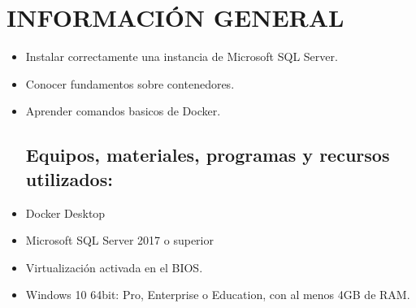 \section{INFORMACIÓN GENERAL} 

\begin{itemize}
\subsection{Objetivos:}
	\item Instalar correctamente una instancia de Microsoft SQL Server.
	\item Conocer fundamentos sobre contenedores.
	\item Aprender comandos basicos de Docker.
\subsection{Equipos, materiales, programas y recursos utilizados:}
	\item Docker Desktop
	\item Microsoft SQL Server 2017 o superior
	\item Virtualización activada en el BIOS.
	\item Windows 10 64bit: Pro, Enterprise o Education, con al menos 4GB de RAM.


\end{itemize}
